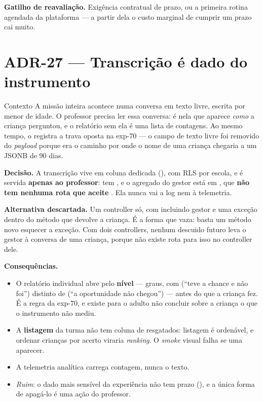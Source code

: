 \textbf{Gatilho de reavaliação.} Exigência contratual de prazo, ou a primeira
rotina agendada da plataforma --- a partir dela o custo marginal de cumprir um
prazo cai muito.

\section{ADR-27 --- Transcrição é dado do instrumento}
\label{adr:transcricao}

\begin{especificacao}{Contexto}
A missão inteira acontece numa conversa em texto livre, escrita por menor de
idade. O professor precisa ler essa conversa: é nela que aparece \emph{como} a
criança perguntou, e o relatório sem ela é uma lista de contagens. Ao mesmo tempo,
o  registra a trava oposta na exp-70 --- o campo de texto livre foi
removido do \emph{payload} porque era o caminho por onde o nome de uma criança
chegaria a um JSONB de 90 dias.
\end{especificacao}

\textbf{Decisão.} A transcrição vive em coluna dedicada
(), com RLS por escola, e é servida
\textbf{apenas ao professor}:  tem
, e o agregado do gestor está em
, que \textbf{não tem nenhuma rota que aceite
}. Ela nunca vai a log nem à telemetria.

\textbf{Alternativa descartada.} Um controller só, com  incluindo
gestor e uma exceção dentro do método que devolve a criança. É a forma que vaza:
basta um método novo esquecer a exceção. Com dois controllers, nenhum descuido
futuro leva o gestor à conversa de uma criança, porque não existe rota para isso
no controller dele.

\textbf{Consequências.}
\begin{itemize}
  \item O relatório individual abre pelo \textbf{nível} --- graus, com
     (\enquote{teve a chance e não foi}) distinto de  (\enquote{a
    oportunidade não chegou}) --- antes do que a criança fez. É a regra da
    exp-70, e existe para o adulto não concluir sobre a criança o que o
    instrumento não mediu.
  \item A \textbf{listagem} da turma não tem coluna de resgatados: listagem é
    ordenável, e ordenar crianças por acerto viraria \emph{ranking}. O
    \emph{smoke} visual falha se uma aparecer.
  \item A telemetria analítica carrega contagem, nunca o texto.
  \item \emph{Ruim}: o dado mais sensível da experiência não tem prazo
    (), e a única forma de apagá-lo é uma ação do professor.
\end{itemize}

